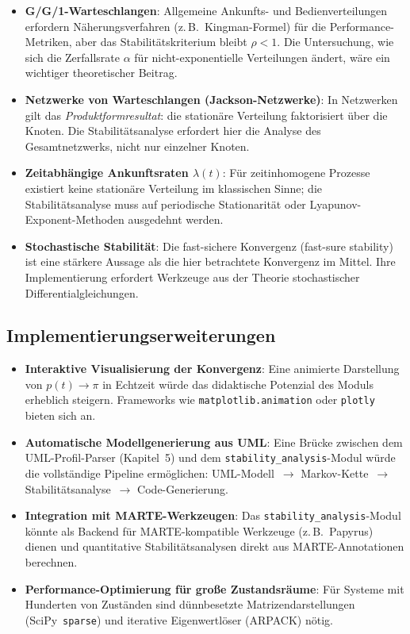 ﻿\documentclass[a4paper,12pt]{report}
\theoremstyle{definition}
\begin{document}
\begin{itemize}
	\item \textbf{G/G/1-Warteschlangen}: Allgemeine Ankunfts- und
	Bedienverteilungen erfordern Näherungsverfahren (z.\,B.\ 
	Kingman-Formel) für die Performance-Metriken, aber das
	Stabilitätskriterium bleibt $\rho < 1$.  Die Untersuchung,
	wie sich die Zerfallsrate $\alpha$ für nicht-exponentielle
	Verteilungen ändert, wäre ein wichtiger theoretischer Beitrag.
	
	\item \textbf{Netzwerke von Warteschlangen (Jackson-Netzwerke)}:
	In Netzwerken gilt das \emph{Produktformresultat}: die
	stationäre Verteilung faktorisiert über die Knoten.  Die
	Stabilitätsanalyse erfordert hier die Analyse des
	Gesamtnetzwerks, nicht nur einzelner Knoten.
	
	\item \textbf{Zeitabhängige Ankunftsraten $\lambda(t)$}: Für
	zeitinhomogene Prozesse existiert keine stationäre
	Verteilung im klassischen Sinne; die Stabilitätsanalyse
	muss auf periodische Stationarität oder
	Lyapunov-Exponent-Methoden ausgedehnt werden.
	
	\item \textbf{Stochastische Stabilität}: Die fast-sichere
	Konvergenz (fast-sure stability) ist eine stärkere Aussage
	als die hier betrachtete Konvergenz im Mittel.  Ihre
	Implementierung erfordert Werkzeuge aus der Theorie
	stochastischer Differentialgleichungen.
\end{itemize}

\subsection{Implementierungserweiterungen}

\begin{itemize}
	\item \textbf{Interaktive Visualisierung der Konvergenz}: Eine
	animierte Darstellung von $p(t) \to \pi$ in Echtzeit würde
	das didaktische Potenzial des Moduls erheblich steigern.
	Frameworks wie \texttt{matplotlib.animation} oder
	\texttt{plotly} bieten sich an.
	
	\item \textbf{Automatische Modellgenerierung aus UML}: Eine
	Brücke zwischen dem UML-Profil-Parser (Kapitel~5) und dem
	\texttt{stability\_analysis}-Modul würde die vollständige
	Pipeline ermöglichen: UML-Modell~$\to$ Markov-Kette~$\to$
	Stabilitätsanalyse~$\to$ Code-Generierung.
	
	\item \textbf{Integration mit MARTE-Werkzeugen}: Das
	\texttt{stability\_analysis}-Modul könnte als Backend für
	MARTE-kompatible Werkzeuge (z.\,B.\ Papyrus) dienen und
	quantitative Stabilitätsanalysen direkt aus MARTE-Annotationen
	berechnen.
	
	\item \textbf{Performance-Optimierung für große Zustandsräume}:
	Für Systeme mit Hunderten von Zuständen sind dünnbesetzte
	Matrizendarstellungen (SciPy~\texttt{sparse}) und
	iterative Eigenwertlöser (ARPACK) nötig.
\end{itemize}
\end{document}
